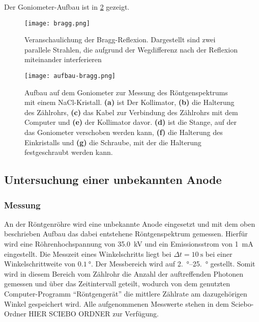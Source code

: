 Der Goniometer-Aufbau ist in \cref{fig:aufbau-bragg} gezeigt.

\begin{figure}[htb]
	\centering
	\texttt{[image: bragg.png]}
	\caption{Veranschaulichung der Bragg-Reflexion. Dargestellt sind zwei parallele Strahlen,
		die aufgrund der Wegdifferenz nach der Reflexion miteinander interferieren}
	\label{fig:bragg}
\end{figure}

\newcommand\ebf[1]{\textbf{(#1)}}
\begin{figure}[htb]
	\centering
	\texttt{[image: aufbau-bragg.png]}
	\caption{Aufbau auf dem Goniometer zur Messung des Röntgenspektrums mit einem NaCl-Kristall. \ebf a ist 
	Der Kollimator, \ebf b die Halterung des Zählrohrs, \ebf c das Kabel zur Verbindung des Zählrohrs mit 
	dem Computer und \ebf e der Kollimator davor. \ebf d ist die Stange, auf der das Goniometer verschoben
	werden kann, \ebf f die Halterung des Einkristalls und \ebf g die Schraube, mit der die Halterung 
	festgeschraubt werden kann.}
	\label{fig:aufbau-bragg}
\end{figure}

\subsection{Untersuchung einer unbekannten Anode}
\subsubsection{Messung}
An der Röntgenröhre wird eine unbekannte Anode eingesetzt und mit dem oben beschrieben Aufbau
das dabei entstehene Röntgenspektrum gemessen. Hierfür wird eine Röhrenhochspannung von \SI{35.0}{\kilo\volt} und
ein Emissionsstrom von \SI{1}{\milli\ampere} eingestellt. Die Messzeit eines Winkelschritts liegt bei
$\Delta t = \SI{10}{\second}$
bei einer Winkelschrittweite von $\SI{0.1}{\degree}$. Der Messbereich wird auf \qtyrange{2.}{25.}{\degree} gestellt.
Somit wird in diesem Bereich vom Zählrohr die Anzahl der auftreffenden Photonen gemessen
und über das Zeitintervall geteilt, wodurch von dem genutzten Computer-Programm
\enquote{Röntgengerät} die mittlere Zählrate am dazugehörigen Winkel gespeichert wird. Alle
aufgenommenen Messwerte stehen in dem Sciebo-Ordner HIER SCIEBO ORDNER
zur Verfügung.

